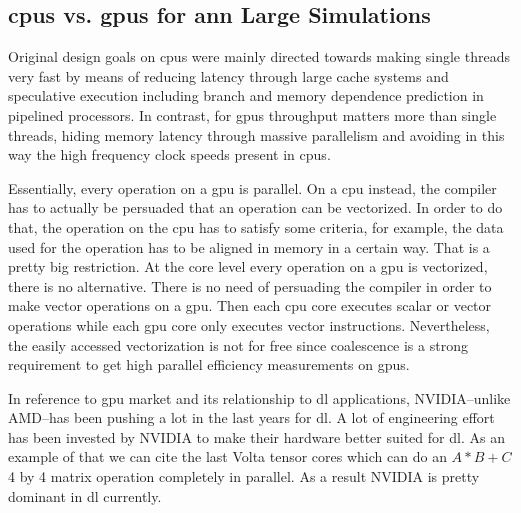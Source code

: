 \documentclass[10pt,journal,compsoc]{IEEEtran}
\begin{document}
\subsection{\glspl{cpu} vs. \glspl{gpu} for \gls{ann} Large Simulations}

Original design goals on \glspl{cpu} were mainly directed towards making single threads very fast by means of reducing latency through large cache systems and speculative execution including branch and memory dependence prediction in pipelined processors. In contrast, for \glspl{gpu} throughput matters more than single threads, hiding memory latency through massive parallelism and avoiding in this way the high frequency clock speeds present in \glspl{cpu}.

Essentially, every operation on a \gls{gpu} is parallel. On a \gls{cpu} instead, the compiler has to actually be persuaded that an operation can be vectorized. In order to do that, the operation on the \gls{cpu} has to satisfy some criteria, for example, the data used for the operation has to be aligned in memory in a certain way. That is a pretty big restriction. At the core level every operation on a \gls{gpu} is vectorized, there is no alternative. There is no need of persuading the compiler in order to make vector operations on a \gls{gpu}. Then each \gls{cpu} core executes scalar or vector operations while each \gls{gpu} core only executes vector instructions. Nevertheless, the easily accessed vectorization is not for free since coalescence is a strong requirement to get high parallel efficiency measurements on \glspl{gpu}.

In reference to \gls{gpu} market and its relationship to \gls{dl} applications, NVIDIA--unlike AMD--has been pushing a lot in the last years for \gls{dl}. A lot of engineering effort has been invested by NVIDIA to make their hardware better suited for \gls{dl}. As an example of that we can cite the last Volta tensor cores which can do an $A*B+C$ 4 by 4 matrix operation completely in parallel. As a result NVIDIA is pretty dominant in \gls{dl} currently.
\end{document}

